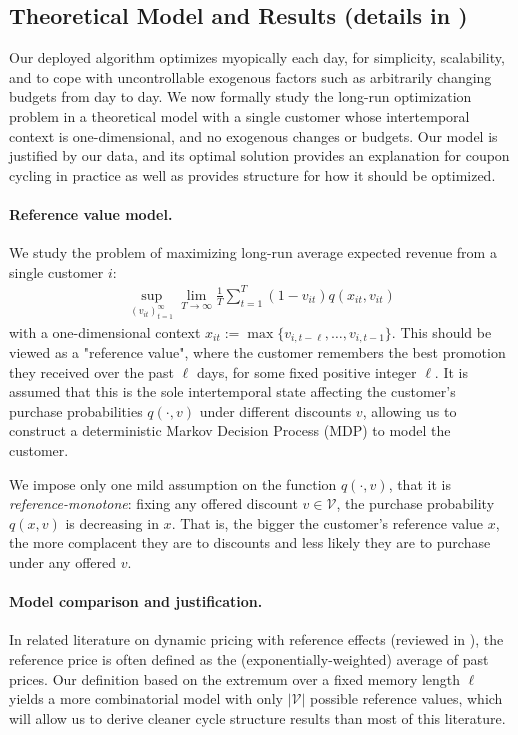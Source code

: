 \documentclass[format=acmsmall, review=false]{acmart}
\newcommand{\cV}{\mathcal{V}}
\begin{document}
\subsection{Theoretical Model and Results (details in )} \label{sec:introTheory}

Our deployed algorithm optimizes myopically each day, for simplicity, scalability, and to cope with uncontrollable exogenous factors such as arbitrarily changing budgets from day to day.
We now formally study the long-run optimization problem in a theoretical model with a single customer whose intertemporal context is one-dimensional, and no exogenous changes or budgets.
Our model is justified by our data, and 
its optimal solution provides an explanation for coupon cycling in practice as well as provides structure for how it should be optimized.

\paragraph{Reference value model.}
We study the problem of maximizing long-run average expected revenue from a single customer $i$:
\begin{align*}
\sup_{(v_{it})_{t=1}^\infty}\lim_{T\to\infty}\frac1T\sum_{t=1}^T (1-v_{it})q(x_{it},v_{it})    
\end{align*}
with a one-dimensional context $x_{it}:=\max\{v_{i,t-\ell},\ldots,v_{i,t-1}\}$.
This should be viewed as a "reference value", where the customer remembers the best promotion they received over the past $\ell$ days, for some fixed positive integer $\ell$.  It is assumed that this is the sole intertemporal state affecting the customer's purchase probabilities $q(\cdot,v)$ under different discounts $v$, allowing us to construct a deterministic Markov Decision Process (MDP) to model the customer.

We impose only one mild assumption on the function $q(\cdot,v)$, that it is \textit{reference-monotone}: fixing any offered discount $v\in\cV$, the purchase probability $q(x,v)$ is decreasing in $x$.  That is, the bigger the customer's reference value $x$, the more complacent they are to discounts and less likely they are to purchase under any offered $v$.

\paragraph{Model comparison and justification.}
In related literature on dynamic pricing with reference effects (reviewed in ), the reference price is often defined as the (exponentially-weighted) average of past prices.  Our definition based on the extremum over a fixed memory length $\ell$ yields a more combinatorial model with only $|\cV|$ possible reference values, which will allow us to derive cleaner cycle structure results than most of this literature.
\end{document}
